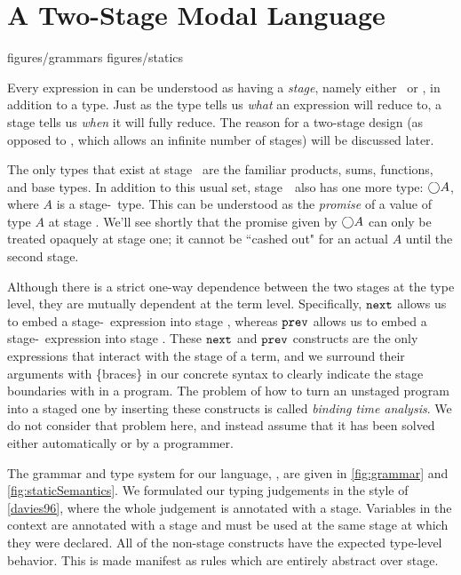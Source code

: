 

\section{A Two-Stage Modal Language}

 {figures/grammars}
 {figures/statics}

Every expression in \lang can be understood as having a {\em stage},
namely either \bbone~or \bbtwo, in addition to a type.
Just as the type tells us {\em what} an expression will reduce to,
a stage tells us {\em when} it will fully reduce. 
The reason for a two-stage design (as opposed to \cite{davies96}, which allows an infinite number of stages) will be discussed later.

The only types that exist at stage \bbtwo~are the familiar products, sums, functions, and base types.
In addition to this usual set, stage~\bbone~also has one more type: $\bigcirc A$, where $A$ is a stage-\bbtwo~type.
This can be understood as the {\em promise} of a value of type $A$ at stage \bbtwo.
We'll see shortly that the promise given by $\bigcirc A$ can only be treated opaquely at stage one; 
it cannot be ``cashed out" for an actual $A$ until the second stage.

Although there is a strict one-way dependence between the two stages at the type level, they are mutually dependent at the term level.
Specifically, ${\tt next}$ allows us to embed a stage-\bbtwo~expression into stage \bbone,
whereas ${\tt prev}$ allows us to embed a stage-\bbone~expression into stage \bbtwo.
These ${\tt next}$ and ${\tt prev}$ constructs are the only expressions that interact with the stage of a term,
and we surround their arguments with \{braces\} in our concrete syntax to clearly indicate the stage boundaries with in a program.
The problem of how to turn an unstaged program into a staged one by inserting these constructs is called {\em binding time analysis}.
We do not consider that problem here, and instead assume that it has been solved either automatically or by a programmer. 

The grammar and type system for our language, \lang, are given in \ref{fig:grammar} and \ref{fig:staticSemantics}.
We formulated our typing judgements in the style of \ref{davies96}, where the whole judgement is annotated with a stage.  
Variables in the context are annotated with a stage and must be used at the same stage at which they were declared.
All of the non-stage constructs have the expected type-level behavior.  
This is made manifest as rules which are entirely abstract over stage.

